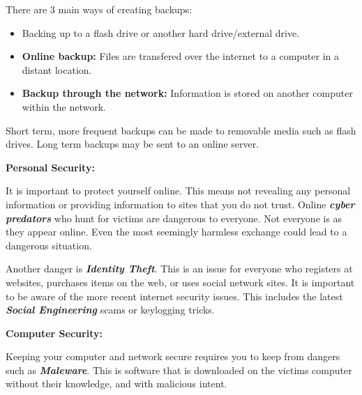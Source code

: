 \documentclass{report}
\begin{document}
    \bigbreak \noindent 
    There are 3 main ways of creating backups:

    \bigbreak \noindent 
    \begin{itemize}
        \item Backing up to a flash drive or another hard drive/external drive.
        \item \textbf{Online backup:} Files are transfered over the internet to a computer in a distant location.
        \item \textbf{Backup through the network:} Information is stored on another computer within the network.
    \end{itemize}

    \bigbreak \noindent 
    Short term, more frequent backups can be made to removable media such as flash drives.
    Long term backups may be sent to an online server.
    
    \bigbreak \noindent \bigbreak \noindent \bigbreak \noindent  
    \begin{Large}
        \textbf{Personal Security:}
    \end{Large}

    \bigbreak \noindent 
    It is important to protect yourself online. This means not revealing any personal
    information or providing information to sites that you do not trust.
    Online \textbf{ \textit{cyber predators}} who hunt for victims are dangerous to everyone. 
    Not everyone is as they appear online. Even the most seemingly harmless exchange 
    could lead to a dangerous situation.

    \bigbreak \noindent 
    Another danger is \textbf{ \textit{Identity Theft}}. This is an issue for 
    everyone who registers at websites, purchases items on the web, or uses social network
    sites. It is important to be aware of the more recent internet security issues. This 
    includes the latest \textbf{ \textit{Social Engineering}} scams or keylogging tricks.


    \bigbreak \noindent \bigbreak \noindent \bigbreak \noindent 
    \begin{Large}
        \textbf{Computer Security:}
    \end{Large}

    \bigbreak \noindent 
    Keeping your computer and network secure requires you to keep from dangers 
    such as \textbf{ \textit{Maleware}}. This is software that is downloaded on the
    victims computer without their knowledge, and with malicious intent.
\end{document}
